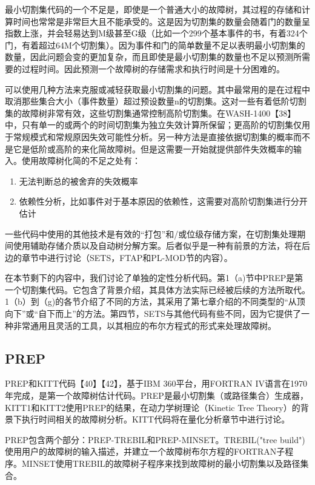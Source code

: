 \documentclass[cn,11pt,chinese]{elegantbook}
\begin{document}
{最小切割集代码的一个不足是，即使是一个普通大小的故障树，其过程的存储和计算时间也常常是非常巨大且不能承受的。这是因为切割集的数量会随着门的数量呈指数上涨，并会轻易达到M级甚至G级（比如一个299个基本事件的书，有着324个门，有着超过64M个切割集）。因为事件和门的简单数量不足以表明最小切割集的数量，因此问题会变的更加复杂，而且即使是最小切割集的数量也不足以预测所需要的过程时间。因此预测一个故障树的存储需求和执行时间是十分困难的。

可以使用几种方法来克服或减轻获取最小切割集的问题。其中最常用的是在过程中取消那些集合大小（事件数量）超过预设数量n的切割集。这对一些有着低阶切割集的故障树非常有效，这些切割集通常控制高阶切割集。在WASH-1400【38】中，只有单一的或两个的时间切割集为独立失效计算所保留；更高阶的切割集仅用于常规模式和常规原因失效可能性分析。另一种方法是直接依据切割集的概率而不是它是低阶或高阶的来化简故障树。但是这需要一开始就提供部件失效概率的输入。使用故障树化简的不足之处有：  
\begin{enumerate}
	\item 无法判断总的被舍弃的失效概率
\item 依赖性分析，比如事件对于基本原因的依赖性，这需要对高阶切割集进行分开估计
\end{enumerate}

一些代码中使用的其他技术是有效的“打包”和/或位级存储方案，在切割集处理期间使用辅助存储介质以及自动树分解方案。后者似乎是一种有前景的方法，将在后边的章节中进行讨论（SETS，FTAP和PL-MOD节的内容）。

在本节剩下的内容中，我们讨论了单独的定性分析代码。第1（a)节中PREP是第一个切割集代码。它包含了背景介绍，其具体方法实际已经被后续的方法所取代。1（b）到（g)的各节介绍了不同的方法，其采用了第七章介绍的不同类型的“从顶向下”或“自下而上”的方法。第四节，SETS与其他代码有些不同，因为它提供了一种非常通用且灵活的工具，以其相应的布尔方程式的形式来处理故障树。

\subsection{PREP}
PREP和KITT代码【40】【42】，基于IBM 360平台，用FORTRAN IV语言在1970年完成，是第一个故障树估计代码。PREP是最小切割集（或路径集合）生成器，KITT1和KITT2使用PREP的结果，在动力学树理论（Kinetic Tree Theory）的背景下执行时间相关的故障树分析。KITT代码将在量化分析章节中进行讨论。

PREP包含两个部分：PREP-TREBIL和PREP-MINSET。TREBIL("tree build")使用用户的故障树的输入描述，并建立一个故障树布尔方程的FORTRAN子程序。MINSET使用TREBIL的故障树子程序来找到故障树的最小切割集以及路径集合。

}
\end{document}
